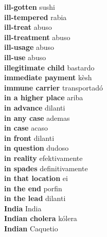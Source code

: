 \textbf{ ill-gotten  } sushi \\
\textbf{ ill-tempered  } rabia \\
\textbf{ ill-treat  } abuso \\
\textbf{ ill-treatment  } abuso \\
\textbf{ ill-usage  } abuso \\
\textbf{ ill-use  } abuso \\
\textbf{ illegitimate child  } bastardo \\
\textbf{ immediate payment  } kèsh \\
\textbf{ immune carrier  } transportadó \\
\textbf{ in a higher place  } ariba \\
\textbf{ in advance  } dilanti \\
\textbf{ in any case  } ademas \\
\textbf{ in case  } acaso \\
\textbf{ in front  } dilanti \\
\textbf{ in question  } dudoso \\
\textbf{ in reality  } efektivamente \\
\textbf{ in spades  } definitivamente \\
\textbf{ in that location  } ei \\
\textbf{ in the end  } porfin \\
\textbf{ in the lead  } dilanti \\
\textbf{ India  } India \\
\textbf{ Indian cholera  } kólera \\
\textbf{ Indian  } Caquetio \\
